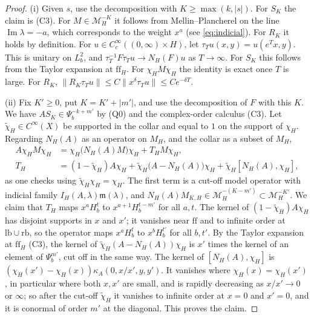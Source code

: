 \documentclass[11pt,oneside,reqno]{article}
\theoremstyle{plain}
\theoremstyle{definition}
\theoremstyle{remark}
\begin{document}
\begin{proof}
(i) Given \(s\), use the decomposition with \(K\geq\max(k,|s|)\). For
\(S_K\) the claim is (C3). For \(M\in\mathcal M_H^{-K}\) it follows from
Mellin--Plancherel on the line \(\operatorname{Im}\lambda=-a\), which
corresponds to the weight \(x^a\) (see \eqref{eq:indicial}). For \(R_K\) it
holds by definition. For \(u\in C_c^\infty((0,\infty)\times H)\), let
\(\tau_Tu(x,y)=u(e^Tx,y)\). This is unitary on \(L^2_b\), and
\(\tau_T^{-1}F\tau_Tu\to N_H(F)u\) as \(T\to\infty\). For \(S_K\) this follows
from the Taylor expansion at \(\mathrm{ff}_H\). For \(\chi_HM\chi_H\) the
identity is exact once \(T\) is large. For \(R_K\),
\(\|R_K\tau_Tu\|\leq C\|x^\delta\tau_Tu\|\leq Ce^{-\delta T}\).

(ii) Fix \(K'\geq0\), put \(K=K'+|m'|\), and use the decomposition of
\(F\) with this \(K\). We have \(AS_K\in\Psi_b^{-k+m'}\) by (Q0) and the
complex-order calculus (C3). Let \(\tilde\chi_H\in C^\infty(X)\) be
supported in the collar and equal to \(1\) on the support of \(\chi_H\).
Regarding \(N_H(A)\) as an operator on \(M_H\), and the collar as a subset
of \(M_H\),
\begin{align*}
 A\chi_HM\chi_H&=\chi_H\bigl(N_H(A)M\bigr)\chi_H+T_HM\chi_H,\\
 T_H&=(1-\tilde\chi_H)A\chi_H+\tilde\chi_H\bigl(A-N_H(A)\bigr)\chi_H
 +\tilde\chi_H[N_H(A),\chi_H],
\end{align*}
as one checks using \(\tilde\chi_H\chi_H=\chi_H\). The first term is a
cut-off model operator with indicial family
\(I_H(A,\lambda)\mathfrak m(\lambda)\), and
\(N_H(A)M_{K,H}\in\mathcal M_H^{-(K-m')}\subset\mathcal M_H^{-K'}\). We
claim that \(T_H\) maps \(x^aH^t_b\) to \(x^{a+1}H^{t-m'}_b\) for all
\(a,t\). The kernel of \((1-\tilde\chi_H)A\chi_H\) has disjoint supports in
\(x\) and \(x'\); it vanishes near \(\mathrm{ff}\) and to infinite order at
\(\mathrm{lb}\cup\mathrm{rb}\), so the operator maps \(x^aH^t_b\) to
\(x^bH^{t'}_b\) for all \(b,t'\). By the Taylor expansion at
\(\mathrm{ff}_H\) (C3), the kernel of \(\tilde\chi_H(A-N_H(A))\chi_H\) is
\(x'\) times the kernel of an element of \(\Psi_b^{m'}\), cut off in the
same way. The kernel of \([N_H(A),\chi_H]\) is
\((\chi_H(x')-\chi_H(x))\kappa_A(0,x/x',y,y')\). It vanishes where
\(\chi_H(x)=\chi_H(x')\), in particular where both \(x,x'\) are small, and
is rapidly decreasing as \(x/x'\to0\) or \(\infty\); so after the cut-off
\(\tilde\chi_H\) it vanishes to infinite order at \(x=0\) and \(x'=0\), and
it is conormal of order \(m'\) at the diagonal. This proves the claim.

\end{proof}
\end{document}
